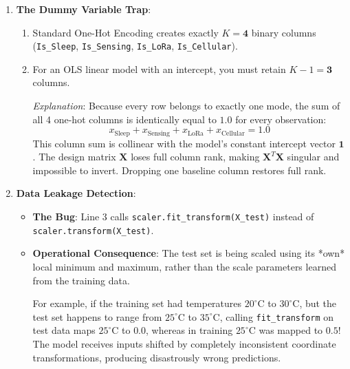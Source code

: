 \begin{enumerate}
    \item \textbf{The Dummy Variable Trap}:
    \begin{enumerate}[label=(\alph*)]
        \item Standard One-Hot Encoding creates exactly $K = \mathbf{4}$ binary columns (\texttt{Is\_Sleep}, \texttt{Is\_Sensing}, \texttt{Is\_LoRa}, \texttt{Is\_Cellular}).
        \item For an OLS linear model with an intercept, you must retain $K - 1 = \mathbf{3}$ columns.
        
        \textit{Explanation}: Because every row belongs to exactly one mode, the sum of all 4 one-hot columns is identically equal to $1.0$ for every observation:
        \begin{equation*}
        x_{\text{Sleep}} + x_{\text{Sensing}} + x_{\text{LoRa}} + x_{\text{Cellular}} = 1.0
        \end{equation*}
        This column sum is collinear with the model's constant intercept vector $\mathbf{1}$. The design matrix $\mathbf{X}$ loses full column rank, making $\mathbf{X}^T \mathbf{X}$ singular and impossible to invert. Dropping one baseline column restores full rank.
    \end{enumerate}

    \item \textbf{Data Leakage Detection}:
    \begin{itemize}
        \item \textbf{The Bug}: Line 3 calls \texttt{scaler.fit\_transform(X\_test)} instead of \texttt{scaler.transform(X\_test)}.
        \item \textbf{Operational Consequence}: The test set is being scaled using its *own* local minimum and maximum, rather than the scale parameters learned from the training data. 
        
        For example, if the training set had temperatures $20^\circ\text{C}$ to $30^\circ\text{C}$, but the test set happens to range from $25^\circ\text{C}$ to $35^\circ\text{C}$, calling \texttt{fit\_transform} on test data maps $25^\circ\text{C}$ to $0.0$, whereas in training $25^\circ\text{C}$ was mapped to $0.5$! The model receives inputs shifted by completely inconsistent coordinate transformations, producing disastrously wrong predictions.
    \end{itemize}


\end{enumerate}
